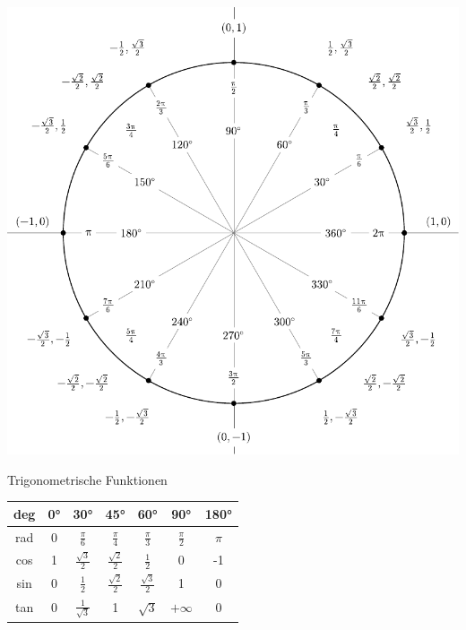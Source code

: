 \documentclass[a4paper,10pt]{article}
\begin{document}
\begin{center}
  \includegraphics[width= \linewidth]{include_degrees_circle.pdf}
\end{center}

\begin{mainbox}{Trigonometrische Funktionen}
  \begin{center} 
    \begin{tabular}{c|cccccc}
      deg & 0° & 30° & 45° & 60° & 90° & 180° \\
      \midrule
      rad & 0 & $\frac{\pi}{6}$ & $\frac{\pi}{4}$ & $\frac{\pi}{3}$ & $\frac{\pi}{2}$ & $\pi$ \\
      cos & 1 & $\frac{\sqrt{3}}{2}$ & $\frac{\sqrt{2}}{2}$ & $\frac{1}{2}$ & 0 & -1 \\
      sin & 0 & $\frac{1}{2}$ & $\frac{\sqrt{2}}{2}$ & $\frac{\sqrt{3}}{2}$ & 1 & 0 \\
      tan & 0 & $\frac{1}{\sqrt{3}}$ & 1 & $\sqrt{3}$ & $+\infty$ & 0 \\
    \end{tabular}
  \end{center}
\end{mainbox}
\end{document}
